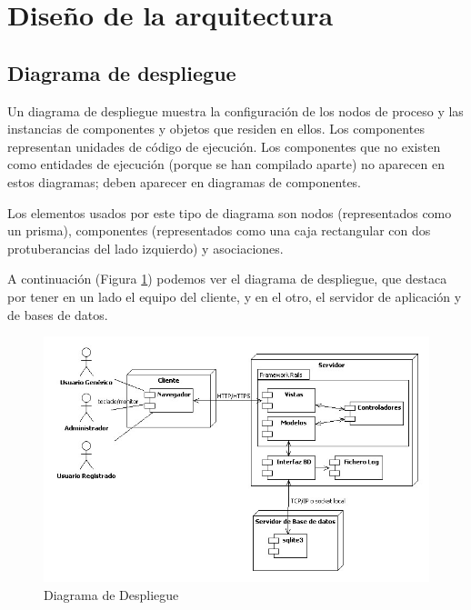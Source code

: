 \section{Diseño de la arquitectura} %
\label{sec:diseno_de_la_arquitectura}

	\subsection{Diagrama de despliegue} %
	\label{sec:diagrama_de_despliegue}

		Un diagrama de despliegue muestra la configuración de los nodos de proceso y las instancias de componentes y objetos que residen en ellos. Los componentes representan unidades de código de ejecución. Los componentes que no existen como entidades de ejecución (porque se han compilado aparte) no aparecen en estos diagramas; deben aparecer en diagramas de componentes.


		Los elementos usados por este tipo de diagrama son nodos (representados como un prisma), componentes (representados como una caja rectangular con dos protuberancias del lado izquierdo) y asociaciones.

		A continuación (Figura \ref{fig:despliegue}) podemos ver el diagrama de despliegue, que destaca por tener en un lado el equipo del cliente, y en el otro, el servidor de aplicación y de bases de datos.

			\begin{figure}[H]
			  \centering
			    \includegraphics[width=16cm]{img/jpg/despliegue/despliegue.jpg}
			  \caption{Diagrama de Despliegue}
			  \label{fig:despliegue}
			\end{figure}


